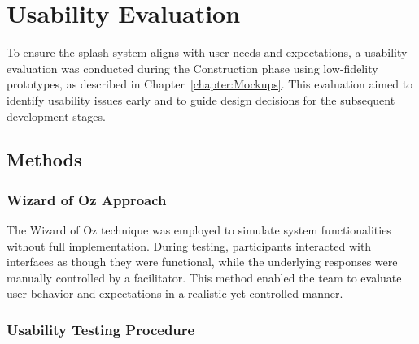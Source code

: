 \chapter{Usability Evaluation}
\label{chapter:Usability}

To ensure the \ac{splash} system aligns with user needs and expectations, a usability evaluation was conducted during the Construction phase using low-fidelity prototypes, as described in Chapter~\ref{chapter:Mockups}. This evaluation aimed to identify usability issues early and to guide design decisions for the subsequent development stages.

\section{Methods}

\subsection{Wizard of Oz Approach}
The Wizard of Oz technique was employed to simulate system functionalities without full implementation. During testing, participants interacted with interfaces as though they were functional, while the underlying responses were manually controlled by a facilitator. This method enabled the team to evaluate user behavior and expectations in a realistic yet controlled manner.

\subsection{Usability Testing Procedure}

